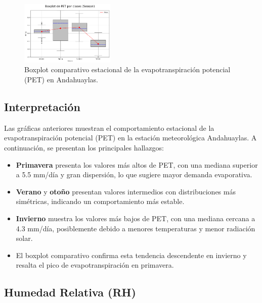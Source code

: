 \vspace{0.2cm}

\begin{figure}[H]
\centering
\includegraphics[width=0.4\textwidth]{resultados/por_estacion_del_anio/boxplot_clases_por_estacion/Andahuaylas/PET_ClassBoxplot_Season.png}
\caption{Boxplot comparativo estacional de la evapotranspiración potencial (PET) en Andahuaylas.}
\label{fig:andahuaylas_pet_box}
\end{figure}

\subsection*{Interpretación}

Las gráficas anteriores muestran el comportamiento estacional de la evapotranspiración potencial (PET) en la estación meteorológica Andahuaylas. A continuación, se presentan los principales hallazgos:

\begin{itemize}
    \item \textbf{Primavera} presenta los valores más altos de PET, con una mediana superior a 5.5 mm/día y gran dispersión, lo que sugiere mayor demanda evaporativa.
    \item \textbf{Verano} y \textbf{otoño} presentan valores intermedios con distribuciones más simétricas, indicando un comportamiento más estable.
    \item \textbf{Invierno} muestra los valores más bajos de PET, con una mediana cercana a 4.3 mm/día, posiblemente debido a menores temperaturas y menor radiación solar.
    \item El boxplot comparativo confirma esta tendencia descendente en invierno y resalta el pico de evapotranspiración en primavera.
\end{itemize}


\subsection{Humedad Relativa (RH)}

